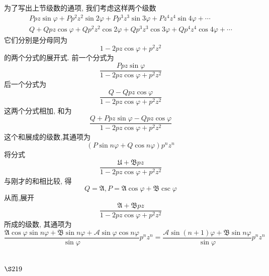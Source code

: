 为了写出上节级数的通项, 我们考虑这样两个级数
\[
\begin{gathered}
P p z \sin \varphi+P p^{2} z^{2} \sin 2 \varphi+P p^{3} z^{3} \sin 3 \varphi+P z^{4} z^{4} \sin 4 \varphi+\cdots \\
Q+Q p z \cos \varphi+Q p^{2} z^{2} \cos 2 \varphi+Q p^{3} z^{3} \cos 3 \varphi+Q p^{4} z^{4} \cos 4 \varphi+\cdots
\end{gathered}
\]
它们分别是分母同为
\[
1-2 p z \cos \varphi+p^{2} z^{2}
\]
的两个分式的展开式. 前一个分式为
\[
\frac{P p z \sin \varphi}{1-2 p z \cos \varphi+p^{2} z^{2}}
\]
后一个分式为
\[
\frac{Q-Q p z \cos \varphi}{1-2 p z \cos \varphi+p^{2} z^{2}}
\]
这两个分式相加, 和为
\[
\frac{Q+P p z \sin \varphi-Q p z \cos \varphi}{1-2 p z \cos \varphi+p^{2} z^{2}}
\]
这个和展成的级数,其通项为
\[
(P \sin n \varphi+Q \cos n \varphi) p^{n} z^{n}
\]
将分式
\[
\frac{\mathfrak{U}+\mathfrak{B} p z}{1-2 p z \cos \varphi+p^{2} z^{2}}
\]
与刚才的和相比较, 得
\[
Q=\mathfrak{A}, P=\mathfrak{A} \cos \varphi+\mathfrak{B} \csc \varphi
\]
从而,展开 
\[
\frac{\mathfrak{A}+\mathfrak{B} p z}{1-2 p z \cos \varphi+p^{2} z^{2}}
\]
所成的级数, 其通项为
\[
\frac{\mathfrak{A} \cos \varphi \sin n \varphi+\mathfrak{B} \sin n \varphi+\mathscr{A} \sin \varphi \cos n \varphi}{\sin \varphi} p^{n} z^{n}=\frac{\mathscr{A} \sin (n+1) \varphi+\mathfrak{B} \sin n \varphi}{\sin \varphi} p^{n} z^{n} 
\]
\section{$\S 219$}

